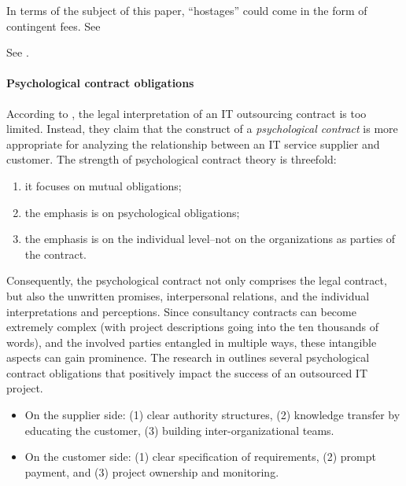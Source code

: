 \documentclass[12pt]{article}
\providecommand{\tightlist}{%
  \setlength{\itemsep}{0pt}\setlength{\parskip}{0pt}}
\begin{document}
In terms of the subject of this paper, ``hostages'' could come in the
form of contingent fees. See \citep[ 243]{clark1993}

See \citet{tosi1997}.

\hypertarget{psychological-contract-obligations}{%
\paragraph{Psychological contract
obligations}\label{psychological-contract-obligations}}

According to \citet[357]{ang2004}, the legal interpretation of an IT
outsourcing contract is too limited. Instead, they claim that the
construct of a \emph{psychological contract} is more appropriate for
analyzing the relationship between an IT service supplier and customer.
The strength of psychological contract theory is threefold:

\begin{enumerate}
\def\labelenumi{\arabic{enumi}.}
\tightlist
\item
  it focuses on mutual obligations;
\item
  the emphasis is on psychological obligations;
\item
  the emphasis is on the individual level--not on the organizations as
  parties of the contract.
\end{enumerate}

Consequently, the psychological contract not only comprises the legal
contract, but also the unwritten promises, interpersonal relations, and
the individual interpretations and perceptions. Since consultancy
contracts can become extremely complex (with project descriptions going
into the ten thousands of words), and the involved parties entangled in
multiple ways, these intangible aspects can gain prominence. The
research in \citet[369-70]{ang2004} outlines several psychological
contract obligations that positively impact the success of an outsourced
IT project.

\begin{itemize}
\tightlist
\item
  On the supplier side: (1) clear authority structures, (2) knowledge
  transfer by educating the customer, (3) building inter-organizational
  teams.
\item
  On the customer side: (1) clear specification of requirements, (2)
  prompt payment, and (3) project ownership and monitoring.
\end{itemize}
\end{document}
